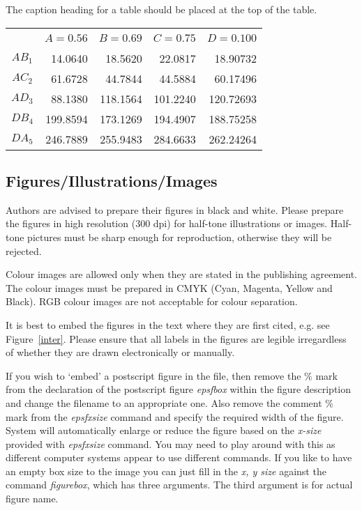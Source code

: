 \documentclass{ws-procs9x6}
\begin{document}
 The caption heading for a table should be placed at the
top of the table.

\begin{table}[ph]
{\footnotesize
\begin{tabular}{@{}crrrr@{}}
\hline
{} &{} &{} &{} &{}\\[-1.5ex]
{} & $A=0.56$ & $B=0.69$ & $C=0.75$ & $D=0.100$\\[1ex]
\hline
{} &{} &{} &{} &{}\\[-1.5ex]
$AB_1$ &14.0640 &18.5620 &22.0817 &18.90732\\[1ex]
$AC_2$ &61.6728 &44.7844 &44.5884 &60.17496\\[1ex]
$AD_3$ &88.1380 &118.1564 &101.2240 &120.72693\\[1ex]
$DB_4$ &199.8594 &173.1269 &194.4907 &188.75258\\[1ex] 
$DA_5$ &246.7889 &255.9483 &284.6633 &262.24264\\[1ex]
\hline
\end{tabular}\label{table2} }
\vspace*{-13pt}
\end{table}

\subsection{Figures/Illustrations/Images}
Authors are advised to prepare their figures in black and white. 
Please prepare the figures in high resolution (300 dpi) for half-tone 
illustrations or images. Half-tone pictures must be sharp enough 
for reproduction, otherwise they will be rejected.

Colour images are allowed only when they are stated in the 
publishing agreement. The colour images must be prepared in CMYK 
(Cyan, Magenta, Yellow and Black). RGB colour images are not acceptable 
for colour\break
separation.

It is best to embed the figures in the text where they are first
cited, e.g. see Figure~\ref{inter}. Please ensure that all labels in the
figures are legible irregardless of whether they are drawn
electronically or manually.

If you wish to `embed' a postscript figure in the file, then remove
the \% mark from the declaration of the postscript figure 
{\em epsfbox} within the figure description and change the filename 
to an appropriate one. Also remove the comment \% mark from the 
{\em epsfxsize} command and specify the required width of the figure.
System will automatically enlarge or reduce the figure based on the
{\em x-size} provided with {\em epsfxsize} command.  You may need to
play around with this as different computer systems appear to use
different commands. If you like to have an empty box size to the image
you can just fill in the {\em x, y size} against the command 
{\em figurebox}, which has three arguments. The third argument is 
for actual figure name.
\end{document}

